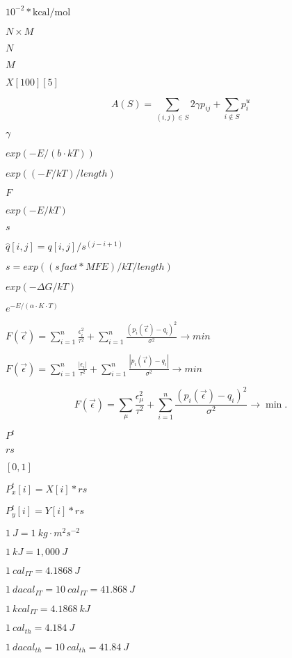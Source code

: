 \documentclass{article}
\begin{document}
$10^{-2} * \mathrm{kcal}/\mathrm{mol}$
\pagebreak

$ N \times M $
\pagebreak

$N$
\pagebreak

$M$
\pagebreak

$X[100][5]$
\pagebreak

\[ A(S) = \sum_{(i,j) \in S} 2 \gamma p_{ij} + \sum_{i \notin S} p^u_i \]
\pagebreak

$\gamma$
\pagebreak

$ exp(-E / (b \cdot kT))$
\pagebreak

$exp{((-F/kT)/length)}$
\pagebreak

$F$
\pagebreak

$ exp(-E / kT) $
\pagebreak

$s$
\pagebreak

$\hat{q}[i,j] = q[i,j] / s^{(j-i+1)}$
\pagebreak

$ s = exp((sfact * MFE) / kT / length )$
\pagebreak

$ exp(-\Delta G / kT) $
\pagebreak

$ e^{-E/(\alpha \cdot K \cdot T)} $
\pagebreak

$ F(\vec\epsilon) = \sum_{i = 1}^n{ \frac{\epsilon_i^2}{\tau^2} } + \sum_{i = 1}^n{ \frac{(p_i(\vec\epsilon) - q_i)^2}{\sigma^2} } \to min $
\pagebreak

$ F(\vec\epsilon) = \sum_{i = 1}^n{ \frac{|\epsilon_i|}{\tau^2} } + \sum_{i = 1}^n{ \frac{|p_i(\vec\epsilon) - q_i|}{\sigma^2} } \to min $
\pagebreak

\[ F(\vec\epsilon) = \sum_{\mu}{ \frac{\epsilon_{\mu}^2}{\tau^2} } + \sum_{i = 1}^n{ \frac{(p_i(\vec\epsilon) - q_i)^2}{\sigma^2} } \to \min. \]
\pagebreak

$P^t$
\pagebreak

$rs$
\pagebreak

$[0,1]$
\pagebreak

$ P^{t}_x[i] = X[i] * rs$
\pagebreak

$P^{t}_y[i] = Y[i] * rs$
\pagebreak

$ 1~J = 1~kg \cdot m^2 s^{-2} $
\pagebreak

$ 1~kJ = 1,000~J $
\pagebreak

$ 1~cal_{IT} = 4.1868~J $
\pagebreak

$ 1~dacal_{IT} = 10~cal_{IT} = 41.868~J $
\pagebreak

$ 1~kcal_{IT} = 4.1868~kJ $
\pagebreak

$ 1~cal_{th} = 4.184~J $
\pagebreak

$ 1~dacal_{th} = 10~cal_{th} = 41.84~J $
\pagebreak
\end{document}
